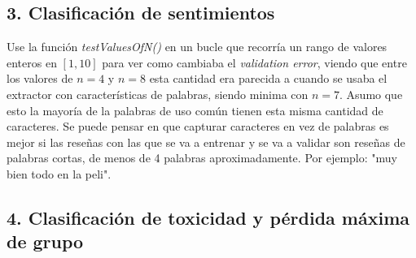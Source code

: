 \documentclass[14pt,a4paper]{report}
\begin{document}
\subsection*{3. Clasificación de sentimientos}
Use la función \textit{testValuesOfN()} en un bucle que recorría un rango de valores enteros en $[1,10]$ para ver como cambiaba el \textit{validation error}, viendo que entre los valores de $n=4$ y $n=8$ esta cantidad era parecida a cuando se usaba el extractor con características de palabras, siendo minima con $n=7$. Asumo que esto la mayoría de la palabras de uso común tienen esta misma cantidad de caracteres. Se puede pensar en que capturar caracteres en vez de palabras es mejor si las reseñas con las que se va a entrenar y se va a validar son reseñas de palabras cortas, de menos de 4 palabras aproximadamente. Por ejemplo: "muy bien todo en la peli".

\subsection*{4. Clasificación de toxicidad y pérdida máxima de grupo}
\end{document}
